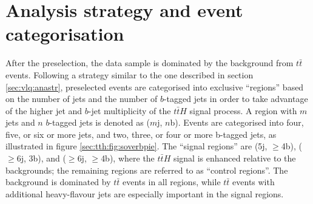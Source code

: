 \section{Analysis strategy and event categorisation}

After the preselection, the data sample is dominated by the background from $t\bar{t}$ events. Following a strategy similar to the one described in section \ref{sec:vlq:anastr}, preselected events are categorised into exclusive ``regions'' based on the number of jets and the number of $b$-tagged jets in order to take advantage of the higher jet and $b$-jet multiplicity of the $t\bar{t}H$ signal process. A region with $m$ jets and $n$ $b$-tagged jets is denoted as ($m$j, $n$b).
Events are categorised into four, five, or six or more jets, and two, three, or four or more b-tagged jets, as illustrated in figure \ref{sec:tth:fig:soverbpie}. The ``signal regions'' are (5j, $\ge$4b), ($\ge$6j, 3b), and ($\ge$6j, $\ge$4b), where the $t\bar{t}H$ signal is enhanced relative to the backgrounds; the remaining regions are referred to as ``control regions''. The background is dominated by $t\bar{t}$ events in all regions, while $t\bar{t}$ events with additional heavy-flavour jets are especially important in the signal regions.

